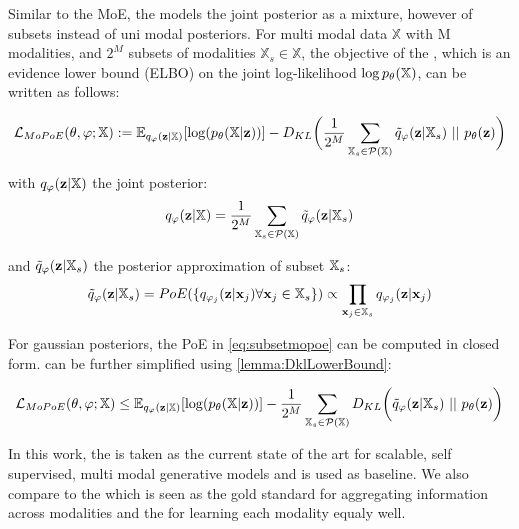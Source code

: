 Similar to the MoE, the  models the joint posterior as a mixture, however of subsets instead of uni modal posteriors.
For multi modal data $\mathbb{X}$ with M modalities, and $2^M$ subsets of modalities $\mathbb{X}_s \in \mathbb{X}$, the objective of the , which is an evidence lower bound (ELBO) on the joint log-likelihood $\log p_{\theta}(\mathbb{X})$, can be written as follows:

\begin{equation}
    \label{eq:mopoe}
    \mathcal{L}_{MoPoE}(\theta, \varphi; \mathbb{X}):= \mathbb{E}_{q_{\varphi}(\textbf{z}|\mathbb{X})}[\log (p_{\theta}(\mathbb{X}|\textbf{z}))] - D_{KL}\biggl( \frac{1}{2^M} \sum _{\mathbb{X}_s \in \mathcal{P}(\mathbb{X})} \tilde{q}_{\varphi}(\textbf{z}|\mathbb{X}_s)\ ||\ p_{\theta}(\textbf{z})\biggr)
\end{equation}

with $q_{\varphi}(\textbf{z}|\mathbb{X})$ the joint posterior:
\begin{equation}
    q_{\varphi}(\textbf{z}|\mathbb{X}) = \frac{1}{2^M} \sum _{\mathbb{X}_s \in \mathcal{P}(\mathbb{X})} \tilde{q}_{\varphi}(\textbf{z}|\mathbb{X}_s)
\end{equation}

and $\tilde{q}_{\varphi}(\textbf{z}|\mathbb{X}_s)$ the posterior approximation of subset $\mathbb{X}_s$:
\begin{equation}
    \label{eq:subsetmopoe}
    \tilde{q}_{\varphi}(\textbf{z}|\mathbb{X}_s)=PoE(\{q_{\varphi_j}(\textbf{z}|\textbf{x}_j) \forall \textbf{x}_j \in \mathbb{X}_s\}) \propto \prod _{\textbf{x}_j \in \mathbb{X}_s}q_{\varphi_j}(\textbf{z}|\textbf{x}_j)
\end{equation}

For gaussian posteriors, the PoE in \cref{eq:subsetmopoe} can be computed in closed form.
 can be further simplified using \cref{lemma:DklLowerBound}:

\begin{equation}
    \label{eq:mopoe_}
    \lmopoe \leq \mathbb{E}_{q_{\phi}(\textbf{z}|\mathbb{X})}[\log (p_{\theta}(\mathbb{X}|\textbf{z}))] - \frac{1}{2^M} \sum _{\mathbb{X}_s \in \mathcal{P}(\mathbb{X})} D_{KL}\biggl( \tilde{q}_{\phi}(\textbf{z}|\mathbb{X}_s)\ ||\ p_{\theta}(\textbf{z})\biggr)
\end{equation}

In this work, the  is taken as the current state of the art for scalable, self supervised, multi modal generative models and is used as baseline.
We also compare to the  which is seen as the gold standard for aggregating information across modalities and the  for learning each modality equaly well.

\smallskip

